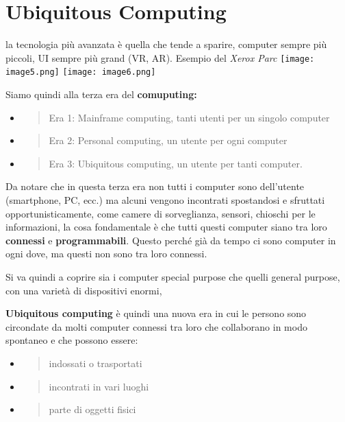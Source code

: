 \section{Ubiquitous Computing }
\label{ubiquitous-computing}

la tecnologia più avanzata è quella che tende a sparire, computer sempre
più piccoli, UI sempre più grand (VR, AR). Esempio del \textit{Xerox Parc}
\texttt{[image: image5.png]}
\texttt{[image: image6.png]}

Siamo quindi alla terza era del \textbf{comuputing:}

\begin{itemize}
\item
  \begin{quote}
  Era 1: Mainframe computing, tanti utenti per un singolo computer
  \end{quote}
\item
  \begin{quote}
  Era 2: Personal computing, un utente per ogni computer
  \end{quote}
\item
  \begin{quote}
  Era 3: Ubiquitous computing, un utente per tanti computer.
  \end{quote}
\end{itemize}

Da notare che in questa terza era non tutti i computer sono dell'utente
(smartphone, PC, ecc.) ma alcuni vengono incontrati spostandosi e
sfruttati opportunisticamente, come camere di sorveglianza, sensori,
chioschi per le informazioni, la cosa fondamentale è che tutti questi
computer siano tra loro \textbf{connessi} e \textbf{programmabili}.
Questo perché già da tempo ci sono computer in ogni dove, ma questi non
sono tra loro connessi.

Si va quindi a coprire sia i computer special purpose che quelli general
purpose, con una varietà di dispositivi enormi,

\textbf{Ubiquitous computing} è quindi una nuova era in cui le persono
sono circondate da molti computer connessi tra loro che collaborano in
modo spontaneo e che possono essere:

\begin{itemize}
\item
  \begin{quote}
  indossati o trasportati
  \end{quote}
\item
  \begin{quote}
  incontrati in vari luoghi
  \end{quote}
\item
  \begin{quote}
  parte di oggetti fisici
  \end{quote}
\end{itemize}

